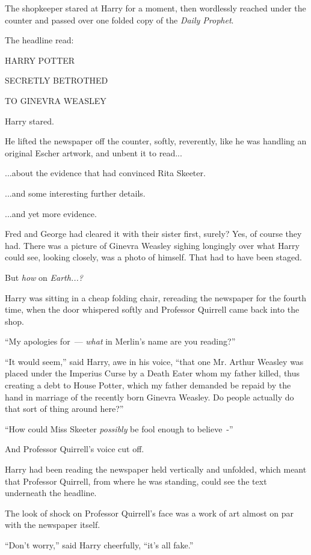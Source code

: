 The shopkeeper stared at Harry for a moment, then wordlessly reached under the counter and passed over one folded copy of the \emph{Daily Prophet}.

The headline read:

HARRY POTTER

SECRETLY BETROTHED

TO GINEVRA WEASLEY

Harry stared.

He lifted the newspaper off the counter, softly, reverently, like he was handling an original Escher artwork, and unbent it to read...

...about the evidence that had convinced Rita Skeeter.

...and some interesting further details.

...and yet more evidence.

Fred and George had cleared it with their sister first, surely? Yes, of course they had. There was a picture of Ginevra Weasley sighing longingly over what Harry could see, looking closely, was a photo of himself. That had to have been staged.

But \emph{how} on \emph{Earth...?}

Harry was sitting in a cheap folding chair, rereading the newspaper for the fourth time, when the door whispered softly and Professor Quirrell came back into the shop.

``My apologies for~--- \emph{what} in Merlin's name are you reading?''

``It would seem,'' said Harry, awe in his voice, ``that one Mr. Arthur Weasley was placed under the Imperius Curse by a Death Eater whom my father killed, thus creating a debt to House Potter, which my father demanded be repaid by the hand in marriage of the recently born Ginevra Weasley. Do people actually do that sort of thing around here?''

``How could Miss Skeeter \emph{possibly} be fool enough to believe~-''

And Professor Quirrell's voice cut off.

Harry had been reading the newspaper held vertically and unfolded, which meant that Professor Quirrell, from where he was standing, could see the text underneath the headline.

The look of shock on Professor Quirrell's face was a work of art almost on par with the newspaper itself.

``Don't worry,'' said Harry cheerfully, ``it's all fake.''

